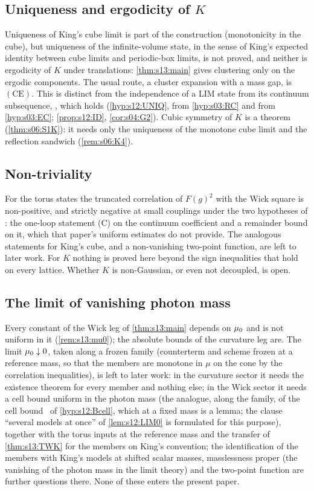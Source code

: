 \subsection{Uniqueness and ergodicity of \texorpdfstring{$K$}{K}}

Uniqueness of King's cube limit is part of the construction (monotonicity in the cube), but uniqueness of the infinite-volume state, in the sense of King's expected identity between cube limits and periodic-box limits, is not proved, and neither is ergodicity of $K$ under translations: \cref{thm:s13:main} gives clustering only on the ergodic components. The usual route, a cluster expansion with a mass gap, is $(\mathrm{CE})$. This is distinct from the independence of a LIM state from its continuum subsequence, \UNIQ, which holds (\cref{hyp:s12:UNIQ}, from \cref{hyp:s03:RC} and from \cref{hyp:s03:EC}; \cref{prop:s12:ID}, \cref{cor:s04:G2}). Cubic symmetry of $K$ is a theorem (\cref{thm:s06:S1K}): it needs only the uniqueness of the monotone cube limit and the reflection sandwich (\cref{rem:s06:K4}).

\subsection{Non-triviality}

For the torus states the truncated correlation of $F(g)^2$ with the Wick square is non-positive, and strictly negative at small couplings under the two hypotheses of \cite[Thm.~12.9]{SymPhase}: the one-loop statement (C) on the continuum coefficient and a remainder bound on it, which that paper's uniform estimates do not provide. The analogous statements for King's cube, and a non-vanishing two-point function, are left to later work. For $K$ nothing is proved here beyond the sign inequalities that hold on every lattice. Whether $K$ is non-Gaussian, or even not decoupled, is open.

\subsection{The limit of vanishing photon mass}

Every constant of the Wick leg of \cref{thm:s13:main} depends on $\mu_0$ and is not uniform in it (\cref{rem:s13:mu0}); the absolute bounds of the curvature leg are. The limit $\mu_0\downarrow0$, taken along a frozen family (counterterm and scheme frozen at a reference mass, so that the members are monotone in $\mu$ on the cone by the correlation inequalities), is left to later work: in the curvature sector it needs the existence theorem for every member and nothing else; in the Wick sector it needs a cell bound uniform in the photon mass (the analogue, along the family, of the cell bound \Bcell\ of \cref{hyp:s12:Bcell}, which at a fixed mass is a lemma; the clause ``several models at once'' of \cref{lem:s12:LIM0} is formulated for this purpose), together with the torus inputs at the reference mass and the transfer of \cref{thm:s13:TWK} for the members on King's convention; the identification of the members with King's models at shifted scalar masses, masslessness proper (the vanishing of the photon mass in the limit theory) and the two-point function are further questions there. None of these enters the present paper.

